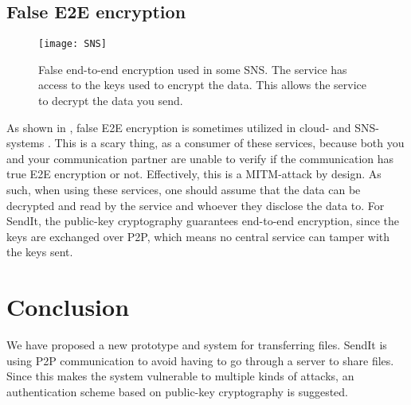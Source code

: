 \documentclass[letterpaper, 10 pt, conference]{ieeeconf}  %
\begin{document}
    \subsection{False E2E encryption}
    \begin{figure}[th]
      \centering
      \texttt{[image: SNS]}
      \caption[SNS: False E2E encryption]{False end-to-end encryption used in some SNS. The service has access to the keys used to encrypt the data. This allows the service to decrypt the data you send.}
      \label{fig:sns}
    \end{figure}
    As shown in , false E2E encryption is sometimes utilized in cloud- and SNS-systems \cite{SkypeSecurity2018, popaSkypeProvidedBackdoor,greenwaldMicrosoftHandedNSA2013}. This is a scary thing, as a consumer of these services, because both you and your communication partner are unable to verify if the communication has true E2E encryption or not. Effectively, this is a MITM-attack by design. As such, when using these services, one should assume that the data can be decrypted and read by the service and whoever they disclose the data to. For SendIt, the public-key cryptography guarantees end-to-end encryption, since the keys are exchanged over P2P, which means no central service can tamper with the keys sent. 

\section{Conclusion}
We have proposed a new prototype and system for transferring files. SendIt is using P2P communication to avoid having to go through a server to share files. Since this makes the system vulnerable to multiple kinds of attacks, an authentication scheme based on public-key cryptography is suggested.
\end{document}
